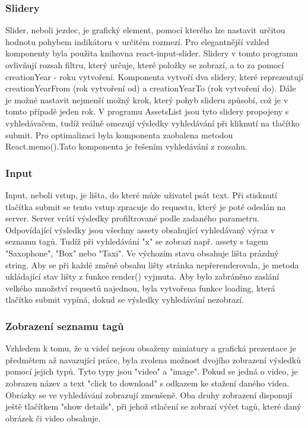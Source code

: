 \subsubsection{Slidery}
Slider, neboli jezdec, je grafický element, pomocí kterého lze nastavit určitou hodnotu pohybem indikátoru v určitém rozmezí. Pro elegantnější vzhled komponenty byla použita knihovna react-input-slider. Slidery v tomto programu ovlivňují rozsah filtru, který určuje, které položky se zobrazí, a to za pomocí creationYear - roku vytvoření. Komponenta vytvoří dva slidery, které reprezentují creationYearFrom (rok vytvoření od) a creationYearTo (rok vytvoření do). Dále je možné nastavit nejmenší možný krok, který pohyb slideru způsobí, což je v tomto případě jeden rok. V programu AssetsList jsou tyto slidery propojeny s vyhledávačem, tudíž reálně omezují výsledky vyhledávání při kliknutí na tlačítko submit. Pro optimalizaci byla komponenta zaobalena metodou React.memo().Tato komponenta je řešením vyhledávání z rozsahu.

\subsubsection{Input}
Input, neboli vstup, je lišta, do které může uživatel psát text. Při stisknutí tlačítka submit se tento vstup zpracuje do requestu, který je poté odeslán na server. Server vrátí výsledky profiltrované podle zadaného parametru. Odpovídající výsledky jsou všechny assety obsahující vyhledávaný výraz v seznamu tagů. Tudíž při vyhledávání "x" se zobrazí např. assety s tagem "Saxophone", "Box" nebo "Taxi".  Ve výchozím stavu obsahuje lišta prázdný string. Aby se při každé změně obsahu lišty stránka nepřerenderovala, je metoda ukládající stav lišty z funkce render() vyjmuta. Aby bylo zabráněno zaslání velkého množství requestů najednou, byla vytvořena funkce loading, která tlačítko submit vypíná, dokud se výsledky vyhledávání nezobrazí.

\subsubsection{Zobrazení seznamu tagů}
Vzhledem k tomu, že u videí nejsou obsaženy miniatury a grafická prezentace je předmětem až navazující práce, byla zvolena možnost dvojího zobrazení výsledků pomocí jejich typů. Tyto typy jsou "video" a "image". Pokud se jedná o video, je zobrazen název a text "click to download" s odkazem ke stažení daného videa. Obrázky se ve vyhledávání zobrazují zmenšeně. Oba druhy zobrazení disponují ještě tlačítkem "show details", při jehož stlačení se zobrazí výčet tagů, které daný obrázek či video obsahuje.

